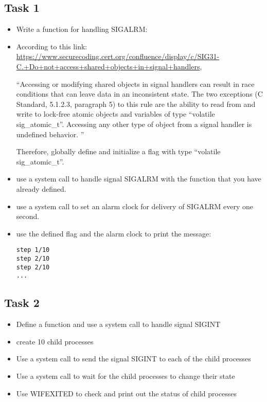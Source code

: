 \documentclass[16pt]{article}
\begin{document}
\subsection*{Task 1}
\begin{itemize}
\item Write a function for handling SIGALRM:
\item According to this link:
\url{https://www.securecoding.cert.org/confluence/display/c/SIG31-C.+Do+not+access+shared+objects+in+signal+handlers},
\begin{displayquote}
``Accessing or modifying shared objects in signal handlers can result in race conditions that can leave data in an inconsistent state. The two exceptions (C Standard, 5.1.2.3, paragraph 5) to this rule are the ability to read from and write to lock-free atomic objects and variables of type ``volatile sig\_atomic\_t''. Accessing any other type of object from a signal handler is undefined behavior. ''
\end{displayquote}
Therefore, globally define and initialize a flag with type ``volatile sig\_atomic\_t''.

\item use a system call to handle signal SIGALRM with the function that you have already defined.

\item use a system call to set an alarm clock for delivery of SIGALRM every one second.

\item use the defined flag and the alarm clock to print the message: 
\begin{verbatim}
step 1/10
step 2/10
step 2/10
...
\end{verbatim}
\end{itemize}

\subsection*{Task 2}
\begin{itemize}
\item Define a function and use a system call to handle signal SIGINT
\item create 10 child processes
\item Use a system call to send the signal SIGINT to each of the child processes
\item Use a system call to wait for the child processes to change their state 
\item Use WIFEXITED to check and print out the status of child processes
\end{itemize}
\end{document}
